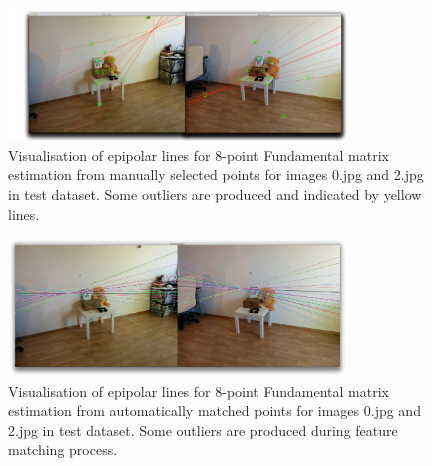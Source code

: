 \begin{figure}[h!]
    \centering
    \includegraphics[width=0.8\textwidth]{02_matching_outliers_epi}
    \caption[Visualisation of epipolar lines for 8-point Fundamental matrix estimation with outliers - 1st example]{Visualisation of epipolar lines for 8-point Fundamental matrix estimation from manually selected points for images 0.jpg and 2.jpg in test dataset. Some outliers are produced and indicated by yellow lines.}
    \label{fig:02_matching_outliers_epi}
\end{figure}

\begin{figure}[h!]
    \centering
    \includegraphics[width=0.8\textwidth]{f_02_8point}
    \caption[Visualisation of epipolar lines for 8-point Fundamental matrix estimation with outliers from automiatically matched correspondences - 1st example]{Visualisation of epipolar lines for 8-point Fundamental matrix estimation from automatically matched points for images 0.jpg and 2.jpg in test dataset. Some outliers are produced during feature matching process.}
    \label{fig:f_02_8-point}
\end{figure}

